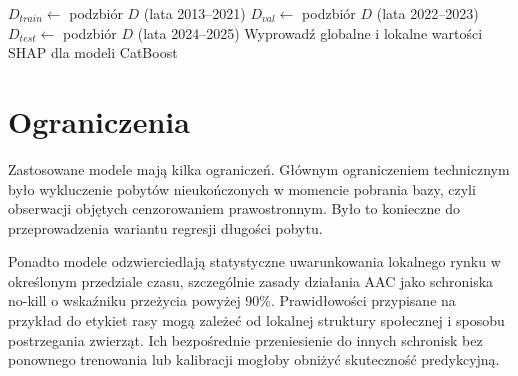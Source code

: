\begin{algorithm}[htbp]
\caption{Protokół treningu i oceny modelu}\label{alg:protokol}
\BlankLine
$D_{train} \gets$ podzbiór $D$ (lata 2013--2021)\;
$D_{val} \gets$ podzbiór $D$ (lata 2022--2023)\;
$D_{test} \gets$ podzbiór $D$ (lata 2024--2025)\;
Wyprowadź globalne i lokalne wartości SHAP dla modeli CatBoost\;
\end{algorithm}

\section{Ograniczenia}
\label{sec:ograniczenia-modelowania}

Zastosowane modele mają kilka ograniczeń. Głównym ograniczeniem technicznym było wykluczenie pobytów nieukończonych w momencie pobrania bazy, czyli obserwacji objętych cenzorowaniem prawostronnym. Było to konieczne do przeprowadzenia wariantu regresji długości pobytu.

Ponadto modele odzwierciedlają statystyczne uwarunkowania lokalnego rynku w określonym przedziale czasu, szczególnie zasady działania AAC jako schroniska no-kill o wskaźniku przeżycia powyżej 90\%. Prawidłowości przypisane na przykład do etykiet rasy mogą zależeć od lokalnej struktury społecznej i sposobu postrzegania zwierząt. Ich bezpośrednie przeniesienie do innych schronisk bez ponownego trenowania lub kalibracji mogłoby obniżyć skuteczność predykcyjną.